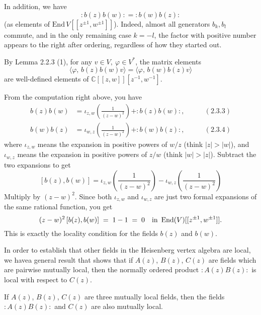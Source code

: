 \documentclass[12pt]{article}
\begin{document}
In addition, we have
\[
:b(z)b(w): = :b(w)b(z):
\]
(as elements of \(\mathrm{End}\,V[[z^{\pm1},w^{\pm1}]]\)).  
Indeed, almost all generators \(b_k,b_l\) commute, and in the only remaining case \(k=-l\), 
the factor with positive number appears to the right after ordering, regardless of how they started out.

By Lemma 2.2.3 (1), for any \(v\in V,\ \varphi\in V^*\), 
the matrix elements
\[
\langle \varphi,\, b(z)b(w)v\rangle = \langle \varphi,\, b(w)b(z)v\rangle
\]
are well-defined elements of \(\mathbb{C}[[z,w]][z^{-1},w^{-1}]\).  

From the computation right above, you have
\begin{align*}
b(z)b(w) &= \iota_{z,w}\!\left(\frac{1}{(z-w)^2}\right) + :b(z)b(w):, \qquad &(2.3.3)\\
b(w)b(z) &= \iota_{w,z}\!\left(\frac{1}{(z-w)^2}\right) + :b(w)b(z):, \qquad &(2.3.4)
\end{align*}
where $\iota_{z,w}$ means the expansion in positive powers of $w/z$ (think $|z|>|w|$), and $\iota_{w,z}$ means the expansion in positive powers of $z/w$ (think $|w|>|z|$). Subtract the two expansions to get
\[
[b(z),b(w)]
= \iota_{z,w}\!\left(\frac{1}{(z-w)^2}\right) - 
\iota_{w,z}\!\left(\frac{1}{(z-w)^2}\right)\]
Multiply by $(z-w)^2$. Since both $\iota_{z,w}$ and $\iota_{w,z}$ are just two formal expansions of the same rational function, you get
\[
(z-w)^2\,[b(z),b(w)] \;=\; 1-1 \;=\; 0
\quad\text{in }\operatorname{End}(V)[[z^{\pm1},w^{\pm1}]].
\]
This is exactly the locality condition for the fields $b(z)$ and $b(w)$.

In order to establish that other fields in the Heisenberg vertex algebra are local,
we havea general result that shows that if $A(z)$, $B(z)$, $C(z)$ are fields which are
pairwise mutually local, then the normally ordered product $:A(z)B(z):$ is local
with respect to $C(z)$.

\begin{lemma}
If $A(z)$, $B(z)$, $C(z)$ are three mutually local fields,
then the fields $:A(z)B(z):$ and $C(z)$ are also mutually local.
\end{lemma}
\end{document}
